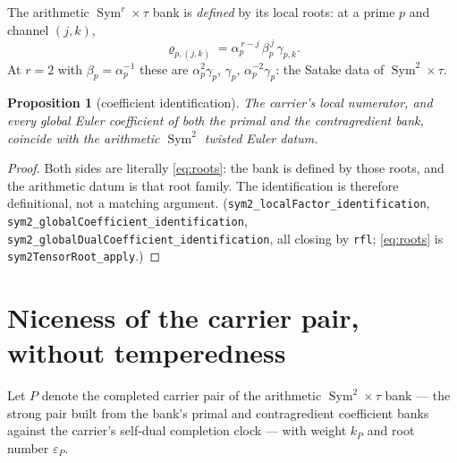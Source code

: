 \documentclass[11pt]{article}
\newtheorem{proposition}[theorem]{Proposition}
\newcommand{\Sym}{\operatorname{Sym}}
\begin{document}
The arithmetic $\Sym^r\!\times\tau$ bank is \emph{defined} by its local roots: at a prime $p$ and
channel $(j,k)$,
\begin{equation}\label{eq:roots}
  \varrho_{p,(j,k)}=\alpha_p^{\,r-j}\,\beta_p^{\,j}\,\gamma_{p,k}.
\end{equation}
At $r=2$ with $\beta_p=\alpha_p^{-1}$ these are $\alpha_p^{2}\gamma_p$, $\gamma_p$,
$\alpha_p^{-2}\gamma_p$: the Satake data of $\Sym^2\!\times\tau$.

\begin{proposition}[coefficient identification]\label{prop:ident}
The carrier's local numerator, and every global Euler coefficient of both the primal and the
contragredient bank, coincide with the arithmetic $\Sym^2$ twisted Euler datum.
\end{proposition}
\begin{proof}
Both sides are literally \eqref{eq:roots}: the bank is defined by those roots, and the arithmetic
datum is that root family. The identification is therefore definitional, not a matching argument.
(\texttt{sym2\_localFactor\_identification},
\texttt{sym2\_globalCoefficient\_identification},
\texttt{sym2\_globalDualCoefficient\_identification}, all closing by \texttt{rfl};
\eqref{eq:roots} is \texttt{sym2TensorRoot\_apply}.)
\end{proof}

\section{Niceness of the carrier pair, without temperedness}

Let $P$ denote the completed carrier pair of the arithmetic $\Sym^2\!\times\tau$ bank --- the
strong pair built from the bank's primal and contragredient coefficient banks against the
carrier's self-dual completion clock --- with weight $k_P$ and root number $\varepsilon_P$.
\end{document}
